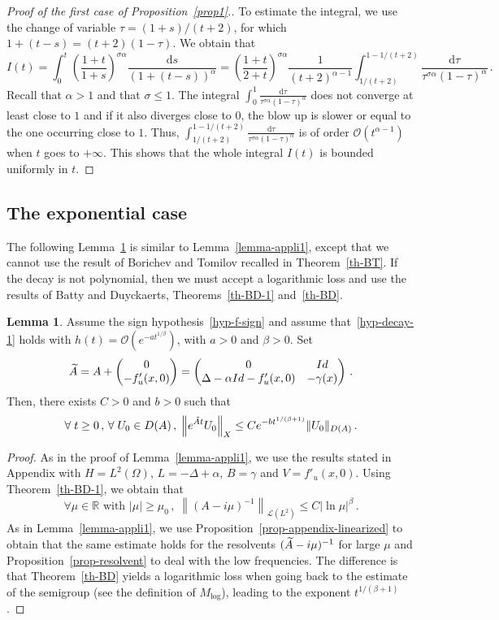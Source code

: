 \documentclass[10pt]{amsart}
\theoremstyle{definition}\newtheorem{defi}[theo]{Definition}\newtheorem{rema}[theo]{Remark}\newtheorem{exam}[theo]{Example}\newtheorem{exem}[theo]{Example}\newtheorem{nota}[theo]{Notation}
\newcommand{\RR}{\mathbb{R}}
\newcommand{\Lc}{\mathcal{L}}
\newcommand{\Oc}{\mathcal{O}}
\newcommand{\drm}{\mathrm{d}}
\let\oldtilde\tilde
\renewcommand*{\tilde}[1]{\mathchoice{\widetilde{#1}}{\widetilde{#1}}{\oldtilde{#1}}{\oldtilde{#1}}}\let\oldexists\exists
\renewcommand*{\exists}{\mathrel{\oldexists}}
\let\oldforall\forall
\renewcommand*{\forall}{\mathrel{\oldforall}}
\newtheorem{lemma}[theo]{Lemma}
\begin{document}
\begin{proof}[{Proof of the first case of Proposition~\ref{prop1}}.]
To estimate the integral, we use the change of variable $\tau = (1+s)/(t+2)$, for which $1+(t-s)=(t+2)(1-\tau)$. We obtain that
\[
I(t)=\int_0^t \left(\frac{1+t}{1+s}\right)^{\sigma\alpha}
\frac{\drm s}{(1+(t-s))^\alpha} = \left(\frac{1+t}{2+t}\right)^{\sigma\alpha}
\frac{1}{(t+2)^{\alpha-1}} \int_{1/(t+2)}^{1-1/(t+2)} \frac {\drm\tau}{\tau^{\sigma\alpha}(1-\tau)^\alpha}\,.
\]
Recall that $\alpha>1$ and that $\sigma \leq 1$. The integral $\int_0^1 \frac {\drm\tau}{\tau^{\sigma\alpha}(1-\tau)^\alpha}$ does not converge at least close to $1$ and if it also diverges close to $0$, the blow up is slower or equal to the one occurring close to $1$. Thus, $\int_{1/(t+2)}^{1-1/(t+2)} \frac {\drm\tau}{\tau^{\sigma\alpha}(1-\tau)^\alpha}$ is of order $\Oc(t^{\alpha-1})$ when $t$ goes to $+\infty$. This shows that the whole integral $I(t)$ is bounded uniformly in $t$. 
\end{proof}

\subsection{The exponential case}
The following Lemma~\ref{lemma-appli2} is similar to Lemma~\ref{lemma-appli1}, except that we cannot use the result of Borichev and Tomilov recalled in Theorem~\ref{th-BT}. If the decay is not polynomial, then we must accept a logarithmic loss and use the results of Batty and Duyckaerts, Theorems~\ref{th-BD-1} and~\ref{th-BD}.

\begin{lemma}\label{lemma-appli2}
Assume the sign hypothesis~\eqref{hyp-f-sign} and assume that~\eqref{hyp-decay-1} holds with $h(t)=\Oc(e^{-a t^{1/\beta}})$, with $a>0$ and $\beta>0$. Set
\[
\tilde A=A +
\begin{pmatrix}
 0 \\
-f'_u(x,0)
\end{pmatrix}=
\begin{pmatrix}
0 & Id\\
\Delta-\alpha Id-f'_u(x,0) & -\gamma(x)
\end{pmatrix}\,.
\]
Then, there exists $C>0$ and $b>0$ such that
\[
\forall t\geq 0\,,\,\forall U_0\in D(A)\,,\;\left\|e^{\tilde At} U_0\right\|_X \leq
Ce^{-b t^{1/(\beta+1)}} \|U_0\|_{D(A)}\,.
\]
\end{lemma}
\begin{proof}
As in the proof of Lemma~\ref{lemma-appli1}, we use the results stated in Appendix with $H=L^2(\Omega)$, $L=-\Delta+\alpha$, $B=\gamma$ and $V=f'_u(x,0)$. Using Theorem~\ref{th-BD-1}, we obtain that
\[
\forall \mu\in\RR\text{ with }|\mu|\geq
\mu_0\,,\;\left\|(A-i\mu)^{-1}\right\|_{\Lc(L^2)} \leq C {|\ln \mu|^{\beta}}\,.
\]
As in Lemma~\ref{lemma-appli1}, we use Proposition~\ref{prop-appendix-linearized} to obtain that the same estimate holds for the resolvents $(\tilde A-i\mu)^{-1}$ for large $\mu$ and Proposition~\ref{prop-resolvent} to deal with the low frequencies. The difference is that Theorem~\ref{th-BD} yields a logarithmic loss when going back to the estimate of the semigroup (see the definition of $M_{\text{log}}$), leading to the exponent $t^{1/(\beta+1)}$.
\end{proof}
\end{document}
